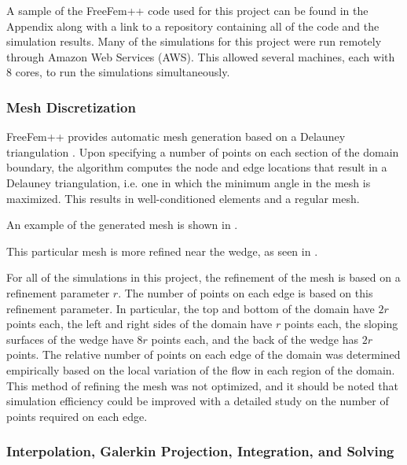 \documentclass[12pt]{article}
\begin{document}
A sample of the \textsf{FreeFem++} code used for this project can be found in the Appendix along with a link to a repository containing all of the code and the simulation results. Many of the simulations for this project were run remotely through Amazon Web Services (AWS). This allowed several machines, each with 8 cores, to run the simulations simultaneously.

\subsubsection{Mesh Discretization}

\textsf{FreeFem++} provides automatic mesh generation based on a Delauney triangulation \cite{hecht2018freefem++}. Upon specifying a number of points on each section of the domain boundary, the algorithm computes the node and edge locations that result in a Delauney triangulation, i.e. one in which the minimum angle in the mesh is maximized. This results in well-conditioned elements and a regular mesh.

An example of the generated mesh is shown in .

This particular mesh is more refined near the wedge, as seen in .

For all of the simulations in this project, the refinement of the mesh is based on a refinement parameter $r$. The number of points on each edge is based on this refinement parameter. In particular, the top and bottom of the domain have $2r$ points each, the left and right sides of the domain have $r$ points each, the sloping surfaces of the wedge have $8r$ points each, and the back of the wedge has $2r$ points. The relative number of points on each edge of the domain was determined empirically based on the local variation of the flow in each region of the domain. This method of refining the mesh was not optimized, and it should be noted that simulation efficiency could be improved with a detailed study on the number of points required on each edge.

\subsubsection{Interpolation,  Galerkin Projection, Integration, and Solving}
\end{document}
